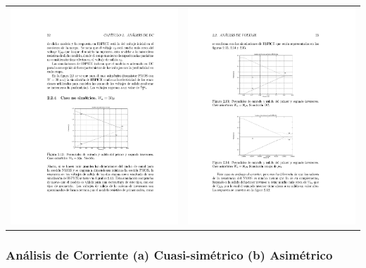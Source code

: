 \documentclass[
paper=128mm:96mm, %
fontsize=11pt, %
pagesize, %
parskip=half-, %
]{scrartcl} %
\theoremstyle{mythmstyle} %
\begin{document}
\begin{table}[ht]
\centering
\begin{tabular}{cc}
\includegraphics[width=0.45\linewidth]{ModeloAsimetricoB}&\includegraphics[width=0.45\linewidth]{SimulacionAsimetricoB}\\
\end{tabular}
\label{tab:gt}
\end{table}

\clearpage

\subsubsection{Análisis de Corriente (a) Cuasi-simétrico (b) Asimétrico}
\label{sec:iddAnalysis}
\end{document}
